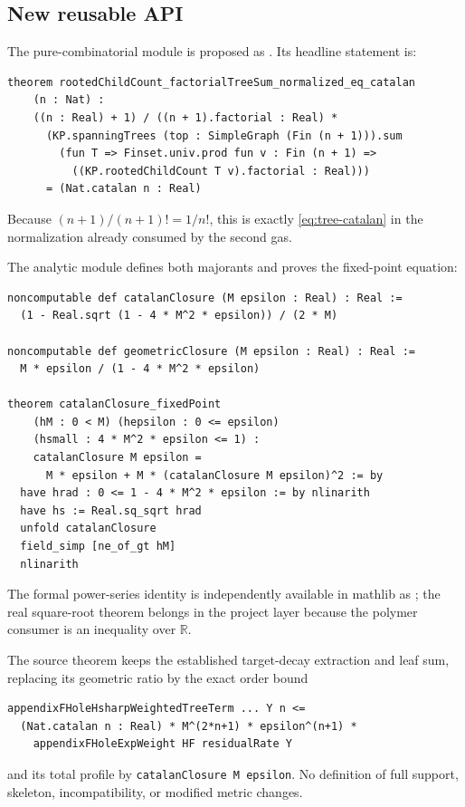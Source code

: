 \documentclass[11pt,a4paper]{article}
\theoremstyle{definition}
\newcommand{\RR}{\mathbb R}
\begin{document}
\subsection{New reusable API}

The pure-combinatorial module is proposed as
.  Its headline statement is:
\begin{lstlisting}
theorem rootedChildCount_factorialTreeSum_normalized_eq_catalan
    (n : Nat) :
    ((n : Real) + 1) / ((n + 1).factorial : Real) *
      (KP.spanningTrees (top : SimpleGraph (Fin (n + 1))).sum
        (fun T => Finset.univ.prod fun v : Fin (n + 1) =>
          ((KP.rootedChildCount T v).factorial : Real)))
      = (Nat.catalan n : Real)
\end{lstlisting}
Because $(n+1)/(n+1)!=1/n!$, this is exactly \eqref{eq:tree-catalan} in the
normalization already consumed by the second gas.

The analytic module defines both majorants and proves the fixed-point equation:
\begin{lstlisting}
noncomputable def catalanClosure (M epsilon : Real) : Real :=
  (1 - Real.sqrt (1 - 4 * M^2 * epsilon)) / (2 * M)

noncomputable def geometricClosure (M epsilon : Real) : Real :=
  M * epsilon / (1 - 4 * M^2 * epsilon)

theorem catalanClosure_fixedPoint
    (hM : 0 < M) (hepsilon : 0 <= epsilon)
    (hsmall : 4 * M^2 * epsilon <= 1) :
    catalanClosure M epsilon =
      M * epsilon + M * (catalanClosure M epsilon)^2 := by
  have hrad : 0 <= 1 - 4 * M^2 * epsilon := by nlinarith
  have hs := Real.sq_sqrt hrad
  unfold catalanClosure
  field_simp [ne_of_gt hM]
  nlinarith
\end{lstlisting}
The formal power-series identity is independently available in mathlib as
; the real square-root theorem belongs
in the project layer because the polymer consumer is an inequality over $\RR$.

The source theorem keeps the established target-decay extraction and leaf sum, replacing
its geometric ratio by the exact order bound
\begin{lstlisting}
appendixFHoleHsharpWeightedTreeTerm ... Y n <=
  (Nat.catalan n : Real) * M^(2*n+1) * epsilon^(n+1) *
    appendixFHoleExpWeight HF residualRate Y
\end{lstlisting}
and its total profile by \texttt{catalanClosure M epsilon}.  No definition of full
support, skeleton, incompatibility, or modified metric changes.
\end{document}
